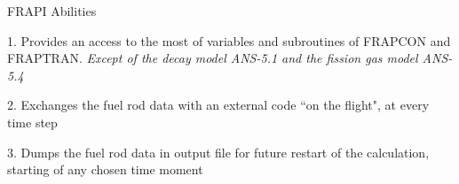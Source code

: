 \begin{frame}{FRAPI Abilities}


  \begin{block}{}
  1. Provides an access to the most of variables and subroutines of FRAPCON and FRAPTRAN.
  \textit{\small Except of the decay model ANS-5.1 and the fission gas model ANS-5.4}
  \end{block}

  \begin{block}{}
  2. Exchanges the fuel rod data with an external code ``on the flight", at every time step
  \end{block}

  \begin{block}{}
  3. Dumps the fuel rod data in output file for future restart of the calculation, starting of any chosen time moment
  \end{block}
  
\end{frame}
